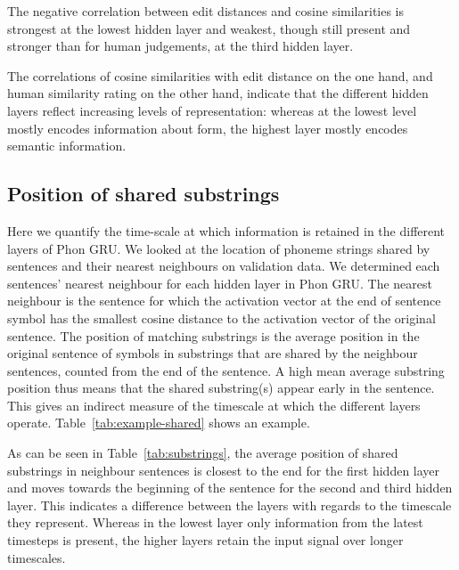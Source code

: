 The negative correlation between edit distances and cosine similarities is strongest at the lowest hidden layer and weakest, though still present and stronger than for human judgements, at the third hidden layer. 

The correlations of cosine similarities with edit distance on the one hand, and human similarity rating on the other hand, indicate that the different hidden layers reflect increasing levels of representation: whereas at the lowest level mostly encodes information about form, the highest layer mostly encodes semantic information.


\subsection{Position of shared substrings}
Here we quantify the time-scale at which information is retained in
the different layers of {\sc Phon GRU}. We looked at the location of
phoneme strings shared by sentences and their nearest neighbours on
validation data. 
We determined each sentences' nearest neighbour for each hidden layer in {\sc Phon GRU}. The nearest neighbour is the sentence for which the activation vector at the end of sentence symbol has the smallest cosine distance to the activation vector of the original sentence. The position of matching substrings is the average position in the original sentence of symbols in substrings that are shared by the neighbour sentences, counted from the end of the sentence. A high mean average substring position thus means that the shared substring(s) appear early in the sentence. This gives an indirect measure of the timescale at which the different layers operate. Table~\ref{tab:example-shared} shows an example.

As can be seen in Table~\ref{tab:substrings}, the average position of shared substrings in neighbour sentences is closest to the end for the first hidden layer and moves towards the beginning of the sentence for the second and third hidden layer. This indicates a difference between the layers with regards to the timescale they represent. Whereas in the lowest layer only information from the latest timesteps is present, the higher layers retain the input  signal over longer timescales.

